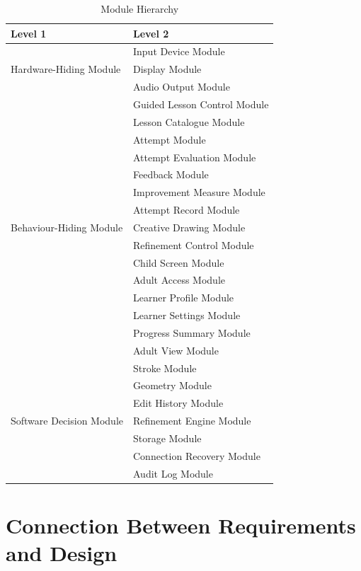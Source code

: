 \documentclass[12pt, titlepage]{article}
\begin{document}
\begin{table}[h!]
\centering
\begin{tabular}{p{} p{}}
\toprule
\textbf{Level 1} & \textbf{Level 2}\\
\midrule

\multirow{3}{0.3\textwidth}{Hardware-Hiding Module} & Input Device Module\\
& Display Module\\
& Audio Output Module\\
\midrule

\multirow{15}{0.3\textwidth}{Behaviour-Hiding Module} & Guided Lesson Control
Module\\
& Lesson Catalogue Module\\
& Attempt Module\\
& Attempt Evaluation Module\\
& Feedback Module\\
& Improvement Measure Module\\
& Attempt Record Module\\
& Creative Drawing Module\\
& Refinement Control Module\\
& Child Screen Module\\
& Adult Access Module\\
& Learner Profile Module\\
& Learner Settings Module\\
& Progress Summary Module\\
& Adult View Module\\
\midrule

\multirow{7}{0.3\textwidth}{Software Decision Module} & Stroke Module\\
& Geometry Module\\
& Edit History Module\\
& Refinement Engine Module\\
& Storage Module\\
& Connection Recovery Module\\
& Audit Log Module\\
\bottomrule

\end{tabular}
\caption{Module Hierarchy}
\label{TblMH}
\end{table}

\section{Connection Between Requirements and Design} \label{SecConnection}
\end{document}
